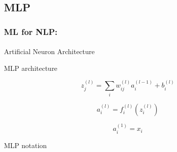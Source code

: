 \documentclass[xcolor=table]{beamer}
\begin{document}
	\subsection{MLP}
	
	\begin{frame}
		\frametitle{ML for NLP: \insertsection}
		\framesubtitle{\insertsubsection}
		
		\begin{minipage}{0.39\textwidth}
			\centering 
			Artificial Neuron Architecture
			
		\end{minipage}
		\begin{minipage}{0.4\textwidth} 
			\centering
			MLP architecture
			
		\end{minipage}
		
		\begin{minipage}{0.39\textwidth}
			\[z_j^{(l)} = \sum_i w_{ij}^{(l)} a_{i}^{(l-1)} + b_{i}^{(l)}\]
			
			\[a_{i}^{(l)} = f_{i}^{(l)}(z_{i}^{(l)})\]
			
			\[a_{i}^{(1)} = x_{i}\]
		\end{minipage}
		\begin{minipage}{0.6\textwidth} 
			\centering
			MLP notation
			
		\end{minipage}
		
	\end{frame}
	
\end{document}
